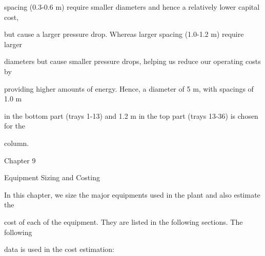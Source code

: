 \documentclass[a4paper,portrait,12pt]{article}
\begin{document}
\begin{flushleft}
spacing (0.3-0.6 m) require smaller diameters and hence a relatively lower capital cost,
\end{flushleft}


\begin{flushleft}
but cause a larger pressure drop. Whereas larger spacing (1.0-1.2 m) require larger
\end{flushleft}


\begin{flushleft}
diameters but cause smaller pressure drops, helping us reduce our operating costs by
\end{flushleft}


\begin{flushleft}
providing higher amounts of energy. Hence, a diameter of 5 m, with spacings of 1.0 m
\end{flushleft}


\begin{flushleft}
in the bottom part (trays 1-13) and 1.2 m in the top part (trays 13-36) is chosen for the
\end{flushleft}


\begin{flushleft}
column.
\end{flushleft}





\begin{flushleft}
\newpage
Chapter 9
\end{flushleft}





\begin{flushleft}
Equipment Sizing and Costing
\end{flushleft}


\begin{flushleft}
In this chapter, we size the major equipments used in the plant and also estimate the
\end{flushleft}


\begin{flushleft}
cost of each of the equipment. They are listed in the following sections. The following
\end{flushleft}


\begin{flushleft}
data is used in the cost estimation:
\end{flushleft}
\end{document}
